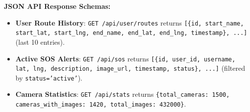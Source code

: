 \textbf{JSON API Response Schemas:}
\begin{itemize}
    \item \textbf{User Route History}: \texttt{GET /api/user/routes} returns \texttt{[\{id, start\_name, start\_lat, start\_lng, end\_name, end\_lat, end\_lng, timestamp\}, ...]} (last 10 entries).
    \item \textbf{Active SOS Alerts}: \texttt{GET /api/sos} returns \texttt{[\{id, user\_id, username, lat, lng, description, image\_url, timestamp, status\}, ...]} (filtered by \texttt{status='active'}).
    \item \textbf{Camera Statistics}: \texttt{GET /api/stats} returns \texttt{\{total\_cameras: 1500, cameras\_with\_images: 1420, total\_images: 432000\}}.
\end{itemize}


